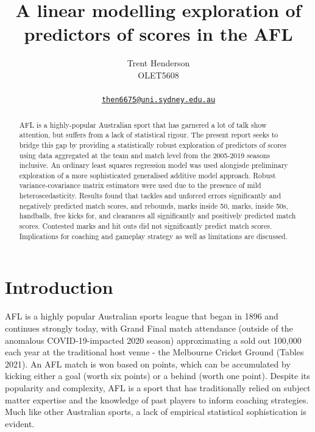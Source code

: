 \documentclass{article}
\title{A linear modelling exploration of predictors of scores in the AFL}
\author{
    Trent Henderson
   \\
    OLET5608 \\
   \\
  \texttt{\href{mailto:then6675@uni.sydney.edu.au}{\nolinkurl{then6675@uni.sydney.edu.au}}} \\
  }
\begin{document}
\maketitle

\def\tightlist{}


\begin{abstract}
AFL is a highly-popular Australian sport that has garnered a lot of talk show attention, but suffers from a lack of statistical rigour. The present report seeks to bridge this gap by providing a statistically robust exploration of predictors of scores using data aggregated at the team and match level from the 2005-2019 seasons inclusive. An ordinary least squares regression model was used alongisde preliminary exploration of a more sophisticated generalised additive model approach. Robust variance-covariance matrix estimators were used due to the presence of mild heteroscedasticity. Results found that tackles and unforced errors significantly and negatively predicted match scores, and rebounds, marks inside 50, marks, inside 50s, handballs, free kicks for, and clearances all significantly and positively predicted match scores. Contested marks and hit outs did not significantly predict match scores. Implications for coaching and gameplay strategy as well as limitations are discussed.
\end{abstract}


\hypertarget{introduction}{%
\section{Introduction}\label{introduction}}

AFL is a highly popular Australian sports league that began in 1896 and continues strongly today, with Grand Final match attendance (outside of the anomalous COVID-19-impacted 2020 season) approximating a sold out 100,000 each year at the traditional host venue - the Melbourne Cricket Ground (Tables 2021). An AFL match is won based on points, which can be accumulated by kicking either a goal (worth six points) or a behind (worth one point). Despite its popularity and complexity, AFL is a sport that has traditionally relied on subject matter expertise and the knowledge of past players to inform coaching strategies. Much like other Australian sports, a lack of empirical statistical sophistication is evident.
\end{document}
